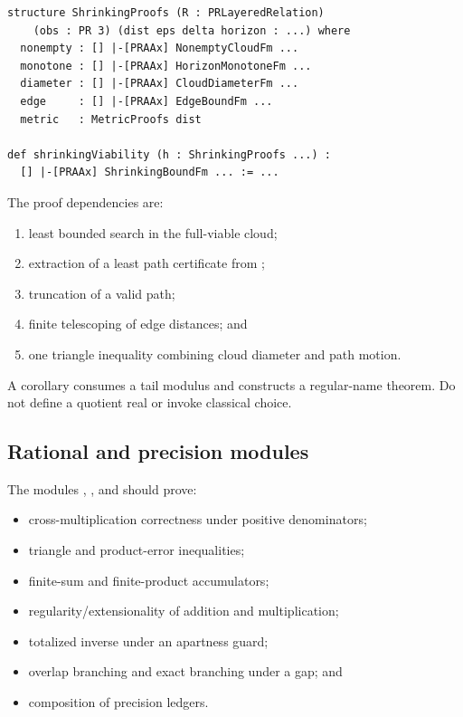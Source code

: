 \begin{lstlisting}[style=lean]
structure ShrinkingProofs (R : PRLayeredRelation)
    (obs : PR 3) (dist eps delta horizon : ...) where
  nonempty : [] |-[PRAAx] NonemptyCloudFm ...
  monotone : [] |-[PRAAx] HorizonMonotoneFm ...
  diameter : [] |-[PRAAx] CloudDiameterFm ...
  edge     : [] |-[PRAAx] EdgeBoundFm ...
  metric   : MetricProofs dist

def shrinkingViability (h : ShrinkingProofs ...) :
  [] |-[PRAAx] ShrinkingBoundFm ... := ...
\end{lstlisting}

The proof dependencies are:

\begin{enumerate}
\item least bounded search in the full-viable cloud;
\item extraction of a least path certificate from ;
\item truncation of a valid path;
\item finite telescoping of edge distances; and
\item one triangle inequality combining cloud diameter and path motion.
\end{enumerate}

A corollary consumes a tail modulus and constructs a regular-name theorem.
Do not define a quotient real or invoke classical choice.

\subsection{Rational and precision modules}

The modules , , and
 should prove:

\begin{itemize}
\item cross-multiplication correctness under positive denominators;
\item triangle and product-error inequalities;
\item finite-sum and finite-product accumulators;
\item regularity/extensionality of addition and multiplication;
\item totalized inverse under an apartness guard;
\item overlap branching and exact branching under a gap; and
\item composition of precision ledgers.
\end{itemize}

